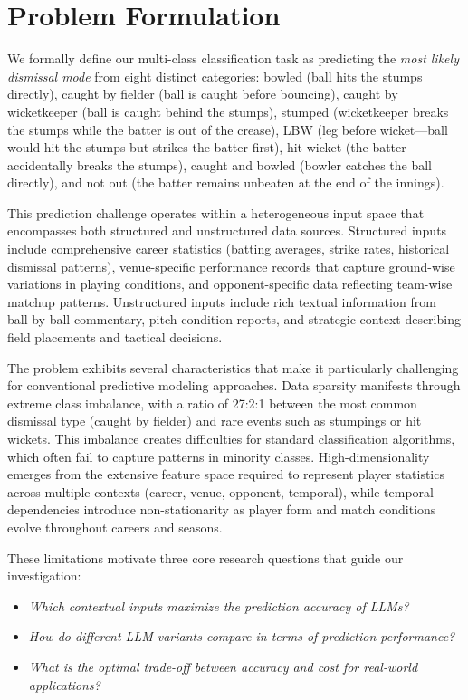 \documentclass[sigconf,anonymous,review]{acmart}
\begin{document}
\section{Problem Formulation}
We formally define our multi-class classification task as predicting the \emph{most likely dismissal mode} from eight distinct categories: bowled (ball hits the stumps directly), caught by fielder (ball is caught before bouncing), caught by wicketkeeper (ball is caught behind the stumps), stumped (wicketkeeper breaks the stumps while the batter is out of the crease), LBW (leg before wicket—ball would hit the stumps but strikes the batter first), hit wicket (the batter accidentally breaks the stumps), caught and bowled (bowler catches the ball directly), and not out (the batter remains unbeaten at the end of the innings).

This prediction challenge operates within a heterogeneous input space that encompasses both structured and unstructured data sources. Structured inputs include comprehensive career statistics (batting averages, strike rates, historical dismissal patterns), venue-specific performance records that capture ground-wise variations in playing conditions, and opponent-specific data reflecting team-wise matchup patterns. Unstructured inputs include rich textual information from ball-by-ball commentary, pitch condition reports, and strategic context describing field placements and tactical decisions.

The problem exhibits several characteristics that make it particularly challenging for conventional predictive modeling approaches. Data sparsity manifests through extreme class imbalance, with a ratio of 27:2:1 between the most common dismissal type (caught by fielder) and rare events such as stumpings or hit wickets. This imbalance creates difficulties for standard classification algorithms, which often fail to capture patterns in minority classes. High-dimensionality emerges from the extensive feature space required to represent player statistics across multiple contexts (career, venue, opponent, temporal), while temporal dependencies introduce non-stationarity as player form and match conditions evolve throughout careers and seasons.

These limitations motivate three core research questions that guide our investigation: 
\begin{itemize}
    \item[\textbf{RQ1}:] \emph{Which contextual inputs maximize the prediction accuracy of LLMs?}
    \item[\textbf{RQ2}:] \emph{How do different LLM variants compare in terms of prediction performance?}
    \item[\textbf{RQ3}:] \emph{What is the optimal trade-off between accuracy and cost for real-world applications?}
\end{itemize}
\end{document}
